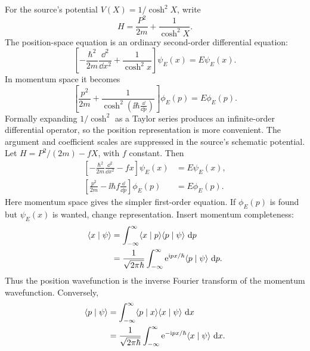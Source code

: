 For the source's potential $V(X)=1/\cosh^2X$, write
\[
 H=\frac{P^2}{2m}+\frac1{\cosh^2X}.
\]
The position-space equation is an ordinary second-order differential equation:
\[
 \left[-\frac{\hbar^2}{2m}\frac{\dd^2}{\dd x^2}
       +\frac1{\cosh^2x}\right]\psi_E(x)=E\psi_E(x).
\]
In momentum space it becomes
\[
 \left[\frac{p^2}{2m}
       +\frac1{\cosh^2\!\left(\ii\hbar\frac{\dd}{\dd p}\right)}\right]
       \phi_E(p)=E\phi_E(p).
\]
Formally expanding $1/\cosh^2$ as a Taylor series produces an
infinite-order differential operator, so the position representation is
more convenient. The argument and coefficient scales are suppressed in
the source's schematic potential.
Let $H=P^2/(2m)-fX$, with $f$ constant. Then
\begin{align*}
 \left[-\frac{\hbar^2}{2m}\frac{\dd^2}{\dd x^2}-fx\right]\psi_E(x)
 &=E\psi_E(x),\\
 \left[\frac{p^2}{2m}-\ii\hbar f\frac{\dd}{\dd p}\right]\phi_E(p)
 &=E\phi_E(p).
\end{align*}
Here momentum space gives the simpler first-order equation.
If $\phi_E(p)$ is found but $\psi_E(x)$ is wanted, change representation.
Insert momentum completeness:
\begin{align*}
 \langle x\mid \psi\rangle
 &=\int_{-\infty}^{\infty}\langle x\mid p\rangle\langle p\mid \psi\rangle\,\mathop{}\!\mathrm{d} p\\
 &=\frac1{\sqrt{2\pi\hbar}}\int_{-\infty}^{\infty}
       \mathrm{e}^{\mathrm{i} px/\hbar}\langle p\mid \psi\rangle\,\mathop{}\!\mathrm{d} p.
\end{align*}
Thus the position wavefunction is the inverse Fourier transform of the
momentum wavefunction. Conversely,
\begin{align*}
 \langle p\mid \psi\rangle
 &=\int_{-\infty}^{\infty}\langle p\mid x\rangle\langle x\mid \psi\rangle\,\mathop{}\!\mathrm{d} x\\
 &=\frac1{\sqrt{2\pi\hbar}}\int_{-\infty}^{\infty}
       \mathrm{e}^{-\mathrm{i} px/\hbar}\langle x\mid \psi\rangle\,\mathop{}\!\mathrm{d} x.
\end{align*}
